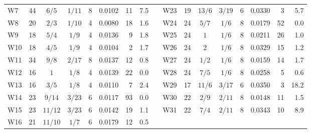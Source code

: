 \documentclass[aps,prb,twocolumn,superscriptaddress,floatfix]{revtex4-2}
\begin{document}
\begin{figure}[p]
{{\begin{ruledtabular}
\begin{tabular}{lrcccrrr@{\hspace{8mm}}c@{\hspace{8mm}}lrcccrrr}
W7 & 44 & $6/5$ & $1/11$ & 8 & 0.0102 & 11 & 7.5 &  & W23 & 19 & $13/6$ & $3/19$ & 6 & 0.0330\rlap{$^*$} & 3 & 5.7 \\
W8 & 20 & $2/3$ & $1/10$ & 4 & 0.0080 & 18 & 1.6 &  & W24 & 24 & $5/7$ & $1/6$ & 8 & 0.0179 & 52 & 0.0 \\
W9 & 18 & $5/4$ & $1/9$ & 4 & 0.0136\rlap{$^*$} & 9 & 1.8 &  & W25 & 24 & $1$ & $1/6$ & 8 & 0.0211\rlap{$^*$} & 26 & 1.0 \\
W10 & 18 & $4/5$ & $1/9$ & 4 & 0.0104 & 2 & 1.7 &  & W26 & 24 & $2$ & $1/6$ & 8 & 0.0329\rlap{$^*$} & 15 & 1.2 \\
W11 & 34 & $9/8$ & $2/17$ & 8 & 0.0137 & 12 & 0.8 &  & W27 & 24 & $1/2$ & $1/6$ & 8 & 0.0159\rlap{$^*$} & 14 & 1.7 \\
W12 & 16 & $1$ & $1/8$ & 4 & 0.0139 & 22 & 0.0 &  & W28 & 24 & $7/5$ & $1/6$ & 8 & 0.0258 & 5 & 0.6 \\
W13 & 16 & $3/5$ & $1/8$ & 4 & 0.0110 & 7 & 2.4 &  & W29 & 17 & $11/6$ & $3/17$ & 6 & 0.0350 & 3 & 18.2 \\
W14 & 23 & $9/14$ & $3/23$ & 6 & 0.0117 & 93 & 0.0 &  & W30 & 22 & $2/9$ & $2/11$ & 8 & 0.0148\rlap{$^*$} & 11 & 1.5 \\
W15 & 23 & $11/12$ & $3/23$ & 6 & 0.0142\rlap{$^*$} & 19 & 1.1 &  & W31 & 22 & $7/4$ & $2/11$ & 8 & 0.0343 & 10 & 8.9 \\
W16 & 21 & $11/10$ & $1/7$ & 6 & 0.0179 & 12 & 0.5 &  &  &  &  &  &  &  &  &  \\
\end{tabular}
\end{ruledtabular}
}
}
\end{figure}
\end{document}

